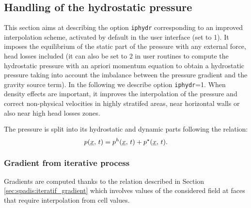 \subsection{Handling of the hydrostatic pressure}
\label{sec:spadis:iphydr}

This section aims at describing the option \texttt{iphydr} corresponding to an
improved interpolation scheme, activated by default in the user interface (set
to 1). It imposes the equilibrium of the static part of the pressure with any
external force, head losses included (it can also be set to 2 in user routines
to compute the hydrostatic pressure with an apriori momentum equation to obtain
a hydrostatic pressure taking into account the imbalance between the pressure
gradient and the gravity source term). In the following we describe option
\texttt{iphydr}=1. When density effects are important, it improves the
interpolation of the pressure and correct non-physical velocities in highly
stratifed areas, near horizontal walls or also near high head losses zones.

The pressure is split into its hydrostatic and dynamic parts following the
relation:
\begin{equation}
	\label{eqn:ph}
    p(\underline{x}, \, t ) = p^h(\underline{x}, \, t) + p^\star(\underline{x}, \, t).
\end{equation}

\subsubsection{Gradient from iterative process} Gradients are computed thanks
to the relation described in Section \ref{sec:spadis:iteratif_gradient} which
involves values of the considered field at faces that require interpolation
from cell values.


